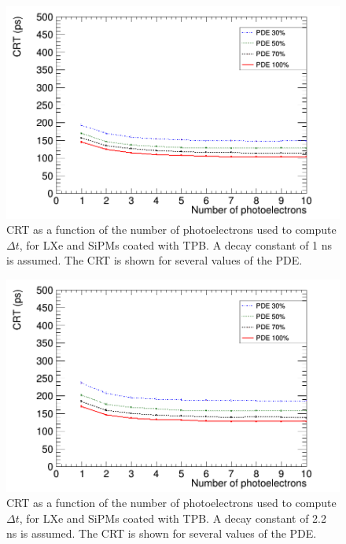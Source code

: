 \documentclass[review]{elsarticle}
\begin{document}
\begin{figure}[!bhtp]
	\centering
	\includegraphics[scale=0.4]{../img/PetaloTOF/tpb_noCher_1d0ns_avg_npe_phys.png}
	\caption{\label{fig.crtTPB1ns} CRT as a function of the number of photoelectrons used to compute $\Delta t$, for LXe and SiPMs coated with TPB. A decay constant of 1 ns is assumed. The CRT is shown for several values of the PDE. }
\end{figure}

\begin{figure}[!bhtp]
	\centering
	\includegraphics[scale=0.4]{../img/PetaloTOF/tpb_noCher_2d2ns_avg_npe_phys.png}
	\caption{\label{fig.crtTPB2ns} CRT as a function of the number of photoelectrons used to compute $\Delta t$, for LXe and SiPMs coated with TPB. A decay constant of 2.2 ns is assumed. The CRT is shown for several values of the PDE. }
\end{figure}
\end{document}
